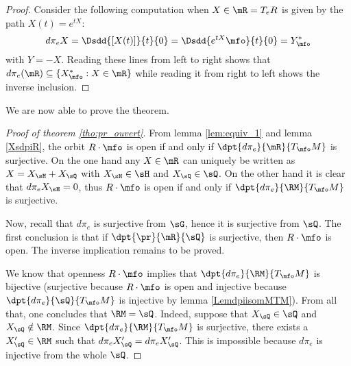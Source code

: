 \begin{proof}
 Consider the following computation when $X\in\mR=T_eR$ is given by the path $X(t)=e^{tX}$:
\begin{equation}
  d\pi_e X=\Dsdd{[X(t)]}{t}{0}
	=\Dsdd{e^{tX}\mfo}{t}{0}
	=Y^*_{\mfo}
\end{equation}
with $Y=-X$. Reading these lines from left to right shows that $d\pi_e(\mR)\subseteq\{X^*_{\mfo}:X\in\mR\}$ while reading it from right to left shows the inverse inclusion.
\end{proof}


We are now able to prove the theorem.

\begin{proof}[Proof of theorem \ref{tho:pr_ouvert}]
From lemma \ref{lem:equiv_1} and lemma \ref{XsdpiR}, the orbit $R\cdot\mfo$ is open if and only if $\dpt{d\pi_e}{\mR}{T_{\mfo}M}$ is surjective. On the one hand any $X\in\mR$ can uniquely be written as $X=X_{\sH}+X_{\sQ}$ with $X_{\sH}\in\sH$ and $X_{\sQ}\in\sQ$. On the other hand it is clear that $d\pi_e X_{\sH}=0$, thus $R\cdot\mfo$ is open if and only if $\dpt{d\pi_e}{\RM}{T_{\mfo}M}$ is surjective.

Now, recall that $d\pi_e$ is surjective from $\sG$, hence it is surjective from $\sQ$. The first conclusion is that if $\dpt{\pr}{\mR}{\sQ}$ is surjective, then $R\cdot\mfo$ is open. The inverse implication remains to be proved.

We know that openness $R\cdot\mfo$ implies that $\dpt{d\pi_e}{\RM}{T_{\mfo}M}$ is bijective (surjective because $R\cdot\mfo$ is open and injective because $\dpt{d\pi_e}{\sQ}{T_{\mfo}M}$ is injective by lemma \ref{LemdpiisomMTM}). From all that, one concludes that $\RM=\sQ$. Indeed,  suppose that $X_{\sQ}\in\sQ$ and $X_{\sQ}\notin\RM$. Since $\dpt{d\pi_e}{\RM}{T_{\mfo}M}$ is surjective, there exists a $X_{\sQ}'\in\RM$ such that $d\pi_eX_{\sQ}'=d\pi_eX_{\sQ}'$. This is impossible because $d\pi_e$ is injective from the whole $\sQ$.

\end{proof}
